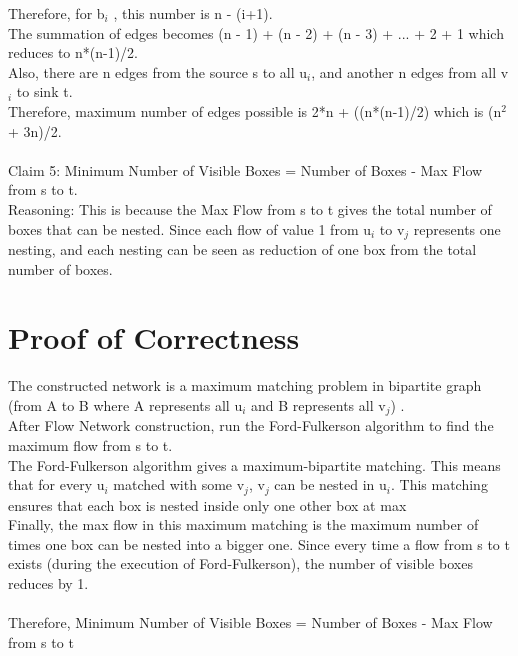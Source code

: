 \documentclass{article}
\begin{document}
Therefore, for b$_i$ , this number is n - (i+1).\\
The summation of edges becomes (n - 1) + (n - 2) + (n - 3) + ... + 2 + 1 which reduces to n*(n-1)/2.\\
Also, there are n edges from the source s to all u$_i$, and another n edges from all v$_i$ to sink t.\\
Therefore, maximum number of edges possible is 2*n + ((n*(n-1)/2) which is (n$^2$ + 3n)/2.\\
\\ 
Claim 5: Minimum Number of Visible Boxes = Number of Boxes - Max Flow from s to t.\\
Reasoning: This is because the Max Flow from s to t gives the total number of boxes that can be nested. Since each flow of value 1 from u$_i$ to v$_j$ represents one nesting, and each nesting can be seen as reduction of one box from the total number of boxes.\\

\section{Proof of Correctness}
The constructed network is a maximum matching problem in bipartite graph (from A to B where A represents all u$_i$ and B represents all v$_j$) .\\
After Flow Network construction, run the Ford-Fulkerson algorithm to find the maximum flow from s to t.\\
The Ford-Fulkerson algorithm gives a maximum-bipartite matching. This means that for every u$_i$ matched with some v$_j$, v$_j$ can be nested in u$_i$. This matching ensures that each box is nested inside only one other box at max\\
Finally, the max flow in this maximum matching is the maximum number of times one box can be nested into a bigger one. Since every time a flow from s to t exists (during the execution of Ford-Fulkerson), the number of visible boxes reduces by 1.\\
\\
Therefore, Minimum Number of Visible Boxes = Number of Boxes - Max Flow from s to t\\
\end{document}

